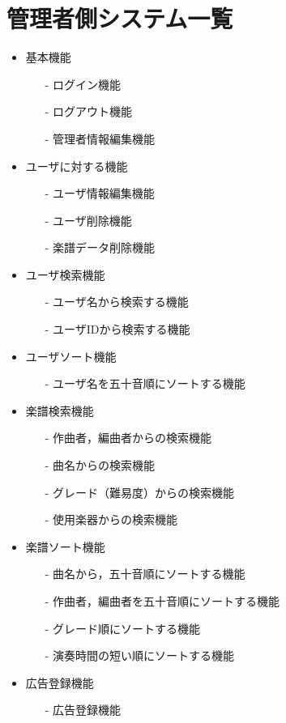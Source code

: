 \clearpage

\section{管理者側システム一覧}
\begin{itemize}
    \item 基本機能
    \begin{enumerate}
        \item[-] ログイン機能
        \item[-] ログアウト機能
        \item[-] 管理者情報編集機能
    \end{enumerate}
    \item ユーザに対する機能
    \begin{enumerate}
        \item[-] ユーザ情報編集機能
        \item[-] ユーザ削除機能
        \item[-] 楽譜データ削除機能
    \end{enumerate}
    \item ユーザ検索機能
    \begin{enumerate}
        \item[-] ユーザ名から検索する機能
        \item[-] ユーザIDから検索する機能
    \end{enumerate}
    \item ユーザソート機能
    \begin{enumerate}
        \item[-] ユーザ名を五十音順にソートする機能
    \end{enumerate}
    \item 楽譜検索機能
    \begin{enumerate}
        \item[-] 作曲者，編曲者からの検索機能
        \item[-] 曲名からの検索機能
        \item[-] グレード（難易度）からの検索機能
        \item[-] 使用楽器からの検索機能
    \end{enumerate}
    \item 楽譜ソート機能
    \begin{enumerate}
        \item[-] 曲名から，五十音順にソートする機能
        \item[-] 作曲者，編曲者を五十音順にソートする機能
        \item[-] グレード順にソートする機能
        \item[-] 演奏時間の短い順にソートする機能
    \end{enumerate}
    \item 広告登録機能
    \begin{enumerate}
        \item[-] 広告登録機能
    \end{enumerate}
\end{itemize}